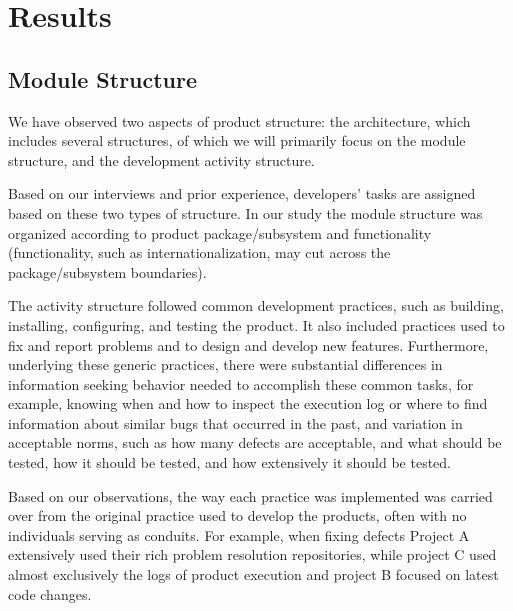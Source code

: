 \documentclass{sig-alternate-05-2015}
\begin{document}

\section{Results}\label{s:result}


\subsection{Module Structure}
We have observed two aspects of product structure: the architecture,
which includes several structures, of which we will primarily focus
on the module structure, and the development activity structure.

Based on our interviews and prior experience, developers' tasks are
assigned based on these two types of structure. In our study the
module structure was organized according to product package/subsystem
and functionality (functionality, such as internationalization, may cut
across the package/subsystem boundaries).

The activity structure followed common development practices, such as
building, installing, configuring, and testing the product. It also
included practices used to fix and report problems and to design and
develop new features. Furthermore, underlying these generic practices,
there were substantial differences in information seeking behavior needed
to accomplish these common tasks, for example, knowing when and how to
inspect the execution log or where to find information about similar bugs
that occurred in the past, and variation in acceptable norms, such as how
many defects are acceptable, and what should be tested, how it should be
tested, and how extensively it should be tested.

Based on our observations, the way each practice was implemented was carried
over from the original practice used to develop the products, often with no
individuals serving as conduits. For example, when fixing defects Project A
extensively used their rich problem resolution repositories, while project C
used almost exclusively the logs of product execution and project B focused
on latest code changes.
\end{document}
